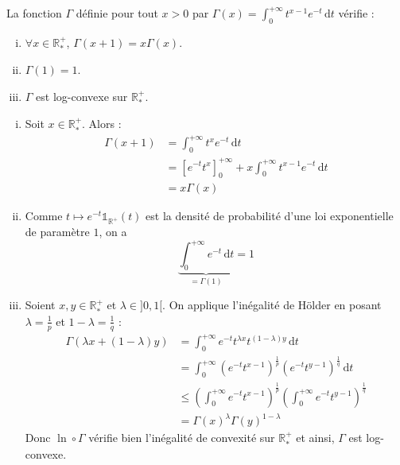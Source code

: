 



	
	\begin{lemma}
		\label{caracterisation-reelle-de-gamma-1}
		La fonction $\Gamma$ définie pour tout $x > 0$ par $\Gamma(x) = \int_0^{+\infty} t^{x-1} e^{-t} \, \mathrm{d}t$ vérifie :
		\begin{enumerate}[(i)]
			\item $\forall x \in \mathbb{R}^+_*$, $\Gamma(x+1) = x\Gamma(x)$.
			\item $\Gamma(1) = 1$.
			\item $\Gamma$ est log-convexe sur $\mathbb{R}^+_*$.
		\end{enumerate}
	\end{lemma}
	
	\begin{demonstration}
		\begin{enumerate}[(i)]
			\item Soit $x \in \mathbb{R}^+_*$. Alors :
			\begin{align*}
				\Gamma(x+1) &= \int_0^{+\infty} t^x e^{-t} \, \mathrm{d}t \\
				&= \left[ e^{-t} t^x \right]_0^{+\infty} + x \int_0^{+\infty} t^{x-1} e^{-t} \, \mathrm{d}t \\
				&= x\Gamma(x)
			\end{align*}
			\item Comme $t \mapsto e^{-t} \mathbb{1}_{\mathbb{R}^+}(t)$ est la densité de probabilité d'une loi exponentielle de paramètre $1$, on a
			\[ \underbrace{\int_0^{+\infty} e^{-t} \, \mathrm{d}t}_{= \Gamma(1)} = 1 \]
			\item Soient $x, y \in \mathbb{R}^+_*$ et $\lambda \in ]0, 1[$. On applique l'inégalité de Hölder en posant $\lambda = \frac{1}{p}$ et $1-\lambda = \frac{1}{q}$ :
			\begin{align*}
				\Gamma(\lambda x + (1-\lambda) y) &= \int_0^{+\infty} e^{-t} t^{\lambda x} t^{(1-\lambda)y} \, \mathrm{d}t \\
				&= \int_0^{+\infty} (e^{-t} t^{x-1})^{\frac{1}{p}} (e^{-t} t^{y-1})^{\frac{1}{q}} \, \mathrm{d}t \\
				&\leq \left (\int_0^{+\infty} e^{-t} t^{x-1} \right)^{\frac{1}{p}} \left (\int_0^{+\infty} e^{-t} t^{y-1} \right)^{\frac{1}{q}} \\
				&= \Gamma(x)^\lambda \Gamma(y)^{1-\lambda}
			\end{align*}
			Donc $\ln \circ \Gamma$ vérifie bien l'inégalité de convexité sur $\mathbb{R}^+_*$ et ainsi, $\Gamma$ est log-convexe.
		\end{enumerate}
	\end{demonstration}
	
